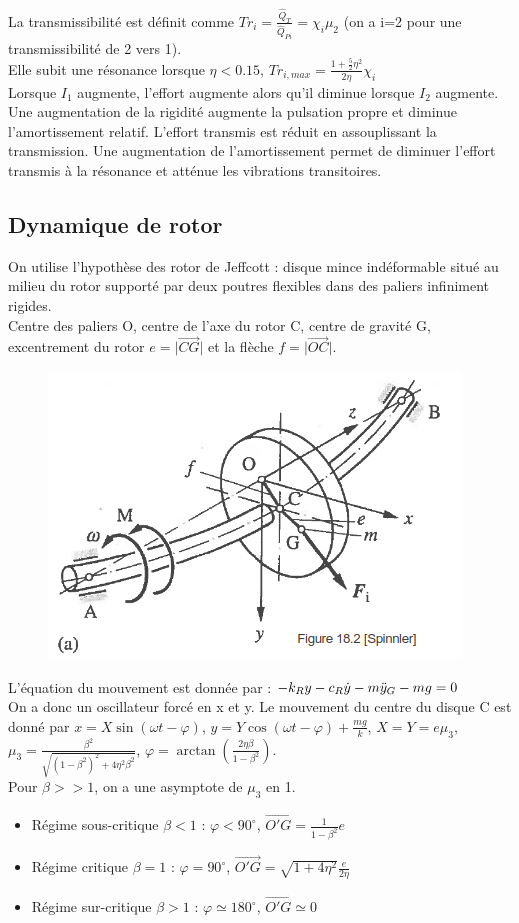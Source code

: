 \documentclass[../main.tex]{subfiles}
\begin{document}
La transmissibilité est définit comme $Tr_i = \frac{\hat{Q}_T}{\hat{Q}_{Pi}} = \chi_i \mu_2$ (on a i=2 pour une transmissibilité de 2 vers 1).\\
Elle subit une résonance lorsque $\eta<0.15$, $Tr_{i,max} = \frac{1+\frac{5}{2} \eta^2}{2\eta} \chi_i$\\

Lorsque $I_1$ augmente, l'effort augmente alors qu'il diminue lorsque $I_2$ augmente. Une augmentation de la rigidité augmente la pulsation propre et diminue l'amortissement relatif. L'effort transmis est réduit en assouplissant la transmission. Une augmentation de l'amortissement permet de diminuer l'effort transmis à la résonance et atténue les vibrations transitoires.\\

\subsection{Dynamique de rotor}
On utilise l'hypothèse des rotor de Jeffcott : disque mince indéformable situé au milieu du rotor supporté par deux poutres flexibles dans des paliers infiniment rigides.\\
Centre des paliers O, centre de l'axe du rotor C, centre de gravité G, excentrement du rotor $e = \lvert \Vec{CG} \rvert$ et la flèche $f = \lvert \Vec{OC} \rvert$.
\begin{figure}[hbt!]
    \centering
    \includegraphics[width=.5\textwidth]{IMAGES/constru/dsm2.png}
\end{figure}

L'équation du mouvement est donnée par : $-k_R y - c_R \dot{y} - m \Ddot{y}_G - mg = 0$\\
On a donc un oscillateur forcé en x et y. Le mouvement du centre du disque C est donné par $x = X \sin(\omega t - \varphi)$, $y = Y \cos(\omega t - \varphi) + \frac{mg}{k}$, $X = Y = e \mu_3$, $\mu_3 = \frac{\beta^2}{\sqrt{(1-\beta^2)^2 + 4\eta^2 \beta^2}}$, $\varphi = \arctan(\frac{2\eta \beta}{1-\beta^2})$.\\
Pour $\beta>>1$, on a une asymptote de $\mu_3$ en 1.\\
\begin{itemize}
    \item Régime sous-critique $\beta<1$ : $\varphi < 90^\circ$, $\Vec{O'G} = \frac{1}{1-\beta^2} e$\\
    \item Régime critique $\beta = 1$ : $\varphi = 90^\circ$, $\Vec{O'G} = \sqrt{1+4\eta^2} \frac{e}{2\eta}$\\
    \item Régime sur-critique $\beta>1$ : $\varphi \simeq 180^\circ$, $\Vec{O'G} \simeq 0$\\
\end{itemize}
\end{document}
